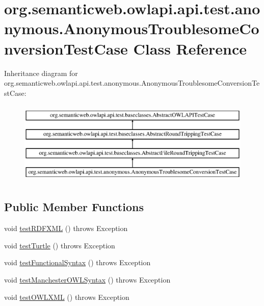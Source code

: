 \hypertarget{classorg_1_1semanticweb_1_1owlapi_1_1api_1_1test_1_1anonymous_1_1_anonymous_troublesome_conversion_test_case}{\section{org.\-semanticweb.\-owlapi.\-api.\-test.\-anonymous.\-Anonymous\-Troublesome\-Conversion\-Test\-Case Class Reference}
\label{classorg_1_1semanticweb_1_1owlapi_1_1api_1_1test_1_1anonymous_1_1_anonymous_troublesome_conversion_test_case}
}
Inheritance diagram for org.\-semanticweb.\-owlapi.\-api.\-test.\-anonymous.\-Anonymous\-Troublesome\-Conversion\-Test\-Case\-:\begin{figure}[H]
\begin{center}
\leavevmode
\includegraphics[height=4.000000cm]{classorg_1_1semanticweb_1_1owlapi_1_1api_1_1test_1_1anonymous_1_1_anonymous_troublesome_conversion_test_case}
\end{center}
\end{figure}
\subsection*{Public Member Functions}
\begin{DoxyCompactItemize}
\item 
void \hyperlink{classorg_1_1semanticweb_1_1owlapi_1_1api_1_1test_1_1anonymous_1_1_anonymous_troublesome_conversion_test_case_a3ef76d3820297c9d92876414aed81c77}{test\-R\-D\-F\-X\-M\-L} ()  throws Exception 
\item 
void \hyperlink{classorg_1_1semanticweb_1_1owlapi_1_1api_1_1test_1_1anonymous_1_1_anonymous_troublesome_conversion_test_case_a6f9b32b95084f5ddf8c0f8ff6ea4a3f5}{test\-Turtle} ()  throws Exception 
\item 
void \hyperlink{classorg_1_1semanticweb_1_1owlapi_1_1api_1_1test_1_1anonymous_1_1_anonymous_troublesome_conversion_test_case_a94973e6eb4ef87c090f1ed1d33a3f7d9}{test\-Functional\-Syntax} ()  throws Exception 
\item 
void \hyperlink{classorg_1_1semanticweb_1_1owlapi_1_1api_1_1test_1_1anonymous_1_1_anonymous_troublesome_conversion_test_case_a999805619a5997b88f38a9cc1f13c84e}{test\-Manchester\-O\-W\-L\-Syntax} ()  throws Exception 
\item 
void \hyperlink{classorg_1_1semanticweb_1_1owlapi_1_1api_1_1test_1_1anonymous_1_1_anonymous_troublesome_conversion_test_case_af6e61593abd69feb94007bbafb7ac92d}{test\-O\-W\-L\-X\-M\-L} ()  throws Exception 
\end{DoxyCompactItemize}
